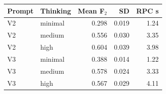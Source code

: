 \begin{tabular}{@{}llrrr@{}}
\toprule
Prompt & Thinking & Mean F$_2$ & SD & RPC s \\
\midrule
V2 & minimal & 0.298 & 0.019 & 1.24 \\
V2 & medium & 0.556 & 0.030 & 3.35 \\
V2 & high & 0.604 & 0.039 & 3.98 \\
V3 & minimal & 0.388 & 0.014 & 1.22 \\
V3 & medium & 0.578 & 0.024 & 3.33 \\
V3 & high & 0.567 & 0.029 & 4.11 \\
\bottomrule
\end{tabular}
